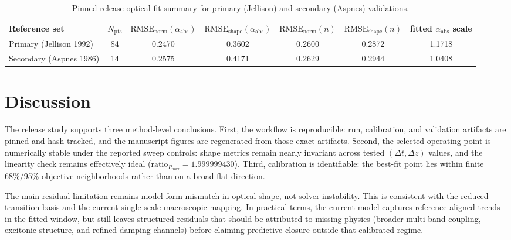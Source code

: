 \documentclass[aps,pra,twocolumn,reprint,superscriptaddress,nofootinbib]{revtex4-2}
\begin{document}
\begin{table}[t]
\centering
\caption{
Pinned release optical-fit summary for primary (Jellison) and secondary
(Aspnes) validations.
}
\label{tab:results_summary}
\begin{tabular}{lcccccc}
\toprule
Reference set & $N_{\mathrm{pts}}$ & $\mathrm{RMSE}_{\mathrm{norm}}(\alpha_{\mathrm{abs}})$ & $\mathrm{RMSE}_{\mathrm{shape}}(\alpha_{\mathrm{abs}})$ & $\mathrm{RMSE}_{\mathrm{norm}}(n)$ & $\mathrm{RMSE}_{\mathrm{shape}}(n)$ & fitted $\alpha_{\mathrm{abs}}$ scale \\
\midrule
Primary (Jellison 1992) & 84 & 0.2470 & 0.3602 & 0.2600 & 0.2872 & 1.1718 \\
Secondary (Aspnes 1986) & 14 & 0.2575 & 0.4171 & 0.2629 & 0.2944 & 1.0408 \\
\bottomrule
\end{tabular}
\setlength{\tabcolsep}{6pt}
\end{table}

\section{Discussion}
The release study supports three method-level conclusions. First, the workflow
is reproducible: run, calibration, and validation artifacts are pinned and
hash-tracked, and the manuscript figures are regenerated from those exact
artifacts. Second, the selected operating point is numerically stable under the
reported sweep controls: shape metrics remain nearly invariant across tested
$(\Delta t,\Delta z)$ values, and the linearity check remains effectively ideal
($\mathrm{ratio}_{P_{\max}}=1.999999430$). Third, calibration is identifiable:
the best-fit point lies within finite 68\%/95\% objective neighborhoods rather
than on a broad flat direction.

The main residual limitation remains model-form mismatch in optical shape, not
solver instability. This is consistent with the reduced transition basis and the
current single-scale macroscopic mapping. In practical terms, the current model
captures reference-aligned trends in the fitted window, but still leaves
structured residuals that should be attributed to missing physics (broader
multi-band coupling, excitonic structure, and refined damping channels) before
claiming predictive closure outside that calibrated regime.
\end{document}
